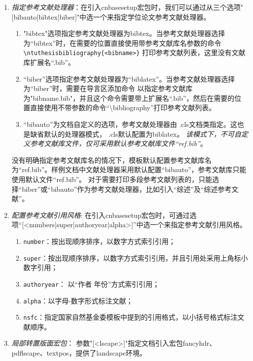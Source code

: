 \begin{enumerate}
    \item \emph{指定参考文献处理器}：在引入cnbasesetup宏包时，我们可以通过从三个选项"[bibauto|bibtex|biber]"中选一个来指定学位论文参考文献处理器。
        \begin{enumerate}
            \item "bibtex"选项指定参考文献处理器为bibtex。当参考文献处理器选择为“bibtex”时，在需要的位置直接使用带参考文献库名参数的命令 \verb|\ntuthesisbibliography{<bibname>}| 打印参考文献列表，这里没有文献库扩展名“.bib”。
            \item “biber”选项指定参考文献处理器为“biblatex”。当参考文献处理器选择为“biber”时，需要在导言区添加命令 \verb|| 以指定参考文献库为"bibname.bib"，并且这个命令需要带上扩展名“.bib”，然后在需要的位置直接使用不带参数的命令“\backslash \projectname bibliography”打印参考文献列表。
            \item “bibauto”为文档自定义的选项，参考文献处理器由 \projectname.cls文档类指定。这也是缺省默认的处理器模式， \projectname.cls默认配置为biblatex。 \emph{该模式下，不可自定义参考文献库文件，仅可采用默认参考文献库文件“ref.bib”}。
        \end{enumerate}
    没有明确指定参考文献库名的情况下，模板默认配置参考文献库名为“ref.bib”。样例文档中文献处理器采用默认配置“bibauto”，参考文献库只能使用默认文件“ref.bib”。
    对于需要打印多段参考文献列表的，只能选择“biber”或“bibauto”作为参考文献处理器，比如引入“综述”及“综述参考文献”。
    \item \emph{配置参考文献引用风格}: 在引入cnbasesetup宏包时，可通过选项“[<numbers|super|authoryear|alpha>]”中选一个来指定参考文献引用风格。
        \begin{enumerate}
        \item \verb|number|：按出现顺序排序，以数字方式索引引用；
        \item \verb|super|：按出现顺序排序，以数字方式索引引用，并且引用处采用上角标小数字引用；
        \item \verb|authoryear|： 以“作者 年份”方式索引引用；
        \item \verb|alpha|：以字母-数字形式标注文献；
        \item \verb|nsfc|：指定国家自然基金委模板中提到的引用格式，以小括号格式标注文献顺序。
        \end{enumerate}
    \item \emph{局部转置版面宏包}： 参数"[<lscape>]"指定文档引入宏包fancyhdr、pdflscape、textpos，提供了landscape环境。

\end{enumerate}
